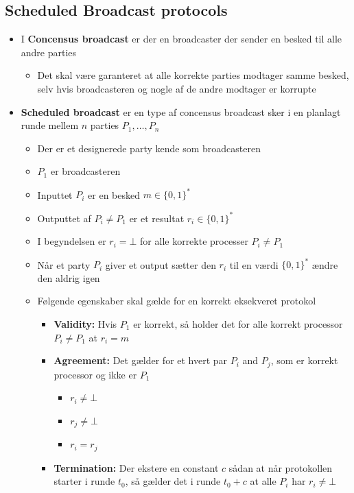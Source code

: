 \documentclass[a4, english]{article}
\begin{document}
\subsection{Scheduled Broadcast protocols}
\begin{itemize}	
  \item I \textbf{Concensus broadcast} er der en broadcaster der sender en besked til alle andre parties
  \begin{itemize}
  	\item Det skal være garanteret at alle korrekte parties modtager samme besked, selv hvis broadcasteren og nogle af de andre modtager er korrupte   
  \end{itemize}
  \item \textbf{Scheduled broadcast} er en type af concensus broadcast sker i en planlagt runde mellem $n$ parties $P_1, \dots, P_n$ 
   \begin{itemize}
    \item Der er et designerede party kende som broadcasteren 
    \item $P_1$ er broadcasteren
    \item Inputtet $P_i$ er en besked $m \in \{0,1\}^*$
	  \item Outputtet af $P_i \ne P_1$ er et resultat $r_i \in \{0,1\}^*$
    \item I begyndelsen er $r_i = \bot$ for alle korrekte processer $P_i \ne P_1$
    \item Når et party $P_i$ giver et output sætter den $r_i$ til en værdi $\{0,1\}^*$ ændre den aldrig igen
    \item Følgende egenskaber skal gælde for en korrekt eksekveret protokol
    \begin{itemize}
    	\item \textbf{Validity:} Hvis $P_1$ er korrekt, så holder det for alle korrekt processor $P_i \ne P_1$ at $r_i=m$
      \item \textbf{Agreement:} Det gælder for et hvert par $P_i$ and $P_j$, som er korrekt processor og ikke er $P_1$
      \begin{itemize}
      	\item $r_i \ne \bot$ 
      	\item $r_j \ne \bot$
      	\item $r_i = r_j$ 
      \end{itemize}
      \item \textbf{Termination:} Der ekstere en constant $c$ sådan at når protokollen starter i runde $t_0$, så gælder det i runde $t_0 + c$ at alle $P_i$ har $r_i \ne \bot$
    \end{itemize}
   \end{itemize}
\end{itemize}
\end{document}
